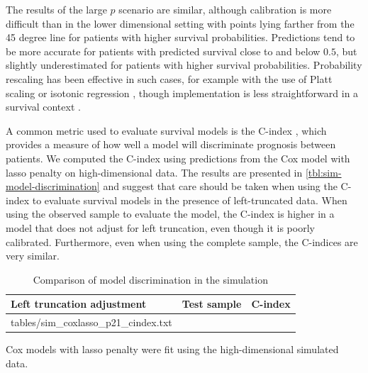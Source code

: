 \documentclass[11pt,final,fleqn]{article}\usepackage[]{graphicx}\usepackage[]{color}
\makeatletter
\theoremstyle{plain}
\newcommand*\ExpandableInput[1]{\@@input#1 }
\makeatother
\begin{document}
\begin{figure}[!ht]
\begin{minipage}{\linewidth}
\end{minipage}
\end{figure}

The results of the large $p$ scenario are similar, although calibration is more difficult than in the lower dimensional setting with points lying farther from the 45 degree line for patients with higher survival probabilities. Predictions tend to be more accurate for patients with predicted survival close to and below $0.5$, but slightly underestimated for patients with higher survival probabilities. Probability rescaling has been effective in such cases, for example with the use of Platt scaling \cite{platt1999scaling} or isotonic regression \cite{niculescu2005isotonic}, though implementation is less straightforward in a survival context \cite{goldstein2021xcal}.

A common metric used to evaluate survival models is the C-index \cite{harrell1996multivariable}, which provides a measure of how well a model will discriminate prognosis between patients. We computed the C-index using predictions from the Cox model with lasso penalty on high-dimensional data. The results are presented in \autoref{tbl:sim-model-discrimination} and suggest that care should be taken when using the C-index to evaluate survival models in the presence of left-truncated data. When using the observed sample to evaluate the model, the C-index is higher in a model that does not adjust for left truncation, even though it is poorly calibrated. Furthermore, even when using the complete sample, the C-indices are very similar. 

\begin{table}[!ht]
\begin{center}
\begin{threeparttable}
\caption{Comparison of model discrimination in the simulation} \label{tbl:sim-model-discrimination}
\begin{tabularx}{.7\textwidth}{@{\extracolsep{\fill}}llr}
\hline
\multicolumn{1}{l}{Left truncation adjustment} & \multicolumn{1}{l}{Test sample} & \multicolumn{1}{l}{C-index} \\
\hline
\ExpandableInput{tables/sim_coxlasso_p21_cindex.txt}
\hline
\end{tabularx}
\scriptsize Cox models with lasso penalty were fit using the high-dimensional simulated data.
\end{threeparttable}
\end{center}
\end{table}
\end{document}
